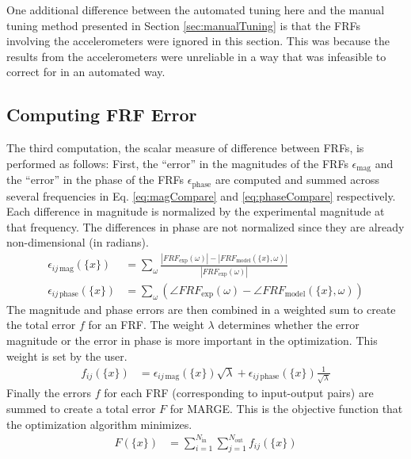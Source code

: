 One additional difference between the automated tuning here and the manual tuning method presented in Section \ref{sec:manualTuning} is that the FRFs involving the accelerometers were ignored in this section. This was because the results from the accelerometers were unreliable in a way that was infeasible to correct for in an automated way.

\subsection{Computing FRF Error} %

The third computation, the scalar measure of difference between FRFs, is performed as follows:
First, the ``error'' in the magnitudes of the FRFs $\epsilon_\text{mag}$ and the ``error'' in the phase of the FRFs $\epsilon_\text{phase}$ are computed and summed across several frequencies in Eq. \ref{eq:magCompare} and \ref{eq:phaseCompare} respectively. Each difference in magnitude is normalized by the experimental magnitude at that frequency. The differences in phase are not normalized since they are already non-dimensional (in radians).
\begin{align}
	\label{eq:magCompare}
	\epsilon_{ij \, \text{mag}}(\{x\}) &= \sum_\omega \frac{|FRF_\text{exp} (\omega)| - |FRF_\text{model}(\{x\},\omega)|}{|FRF_\text{exp} (\omega)|} \\
	\label{eq:phaseCompare}
	\epsilon_{ij \, \text{phase}}(\{x\}) &= \sum_\omega \left( \angle FRF_\text{exp} (\omega) - \angle FRF_\text{model}(\{x\},\omega) \right)
\end{align}
The magnitude and phase errors are then combined in a weighted sum to create the total error $f$ for an FRF. The weight $\lambda$ determines whether the error magnitude or the error in phase is more important in the optimization. This weight is set by the user.
\begin{align}
	f_{ij}(\{x\}) &= \epsilon_{ij \, \text{mag}}(\{x\}) \sqrt{\lambda} + \epsilon_{ij \, \text{phase}}(\{x\}) \frac{1}{\sqrt{\lambda}}
\end{align}
Finally the errors $f$ for each FRF (corresponding to input-output pairs) are summed to create a total error $F$ for MARGE. This is the objective function that the optimization algorithm minimizes.
\begin{align}
	F(\{x\}) &= \sum_{i=1}^{N_\text{in}} \sum_{j=1}^{N_\text{out}} f_{ij}(\{x\})
\end{align}

